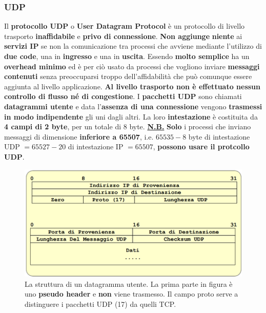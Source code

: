 \documentclass[11pt,a4paper]{article}
\theoremstyle{definition}
\begin{document}
\subsubsection{UDP}
Il \textbf{protocollo UDP} o \textbf{User Datagram Protocol} è un protocollo di livello trasporto \textbf{inaffidabile} e \textbf{privo di connessione}. \textbf{Non aggiunge} \textbf{niente} ai \textbf{servizi IP} se non la comunicazione tra processi che avviene mediante l'utilizzo di \textbf{due code}, una in \textbf{ingresso} e una in \textbf{uscita}. Essendo \textbf{molto semplice} ha un \textbf{overhead minimo} ed è per ciò usato da processi che vogliono inviare \textbf{messaggi contenuti} senza preoccuparsi troppo dell'affidabilità che può comunque essere aggiunta al livello applicazione. \textbf{Al livello trasporto non è effettuato nessun controllo di flusso né di congestione}.\newline
I \textbf{pacchetti UDP} sono chiamati \textbf{datagrammi utente} e data l'\textbf{assenza di una connessione} vengono \textbf{trasmessi in modo indipendente} gli uni dagli altri. La loro \textbf{intestazione} è costituita da \textbf{4 campi di 2 byte}, per un totale di 8 byte.\newline
\textbf{\underline{N.B.}} \textbf{Solo} i processi che inviano messaggi di dimensione \textbf{inferiore a 65507}, i.e. $65535 - 8$ byte di intestazione UDP $= 65527 - 20$ di intestazione IP $ = 65507$, \textbf{possono usare il protcollo UDP}.
\begin{figure}[!h]
	\includegraphics[scale=0.5]{Immagini/UDP.png}
	\centering
	\caption{La struttura di un datagramma utente. La prima parte in figura è uno \textbf{pseudo header} e \textbf{non} viene trasmesso. Il campo proto serve a distinguere i pacchetti UDP (17) da quelli TCP.}
\end{figure}\newline
\end{document}
